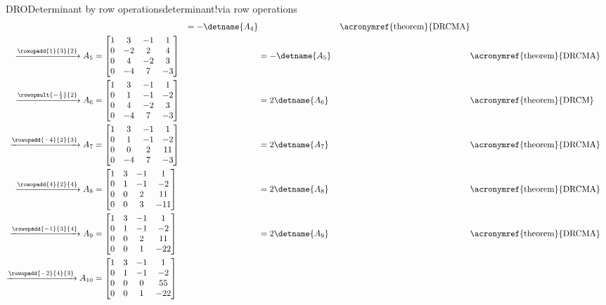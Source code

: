 \begin{example}{DRO}{Determinant by row operations}{determinant!via row operations}
\begin{align*}
&
&=-\detname{A_4}&&\text{\acronymref{theorem}{DRCMA}}\\
\xrightarrow{\rowopadd{1}{3}{2}}
A_5&=
\begin{bmatrix}
1 & 3 &-1 & 1 \\
0 &-2 & 2 & 4 \\
0 & 4 &-2 & 3 \\
0 &-4 & 7 &-3 
\end{bmatrix}
&
&=-\detname{A_5}&&\text{\acronymref{theorem}{DRCMA}}\\
\xrightarrow{\rowopmult{-\frac{1}{2}}{2}}
A_6&=
\begin{bmatrix}
1 & 3 &-1 & 1 \\
0 & 1 &-1 &-2 \\
0 & 4 &-2 & 3 \\
0 &-4 & 7 &-3 
\end{bmatrix}
&
&=2\detname{A_6}&&\text{\acronymref{theorem}{DRCM}}\\
\xrightarrow{\rowopadd{-4}{2}{3}}
A_7&=
\begin{bmatrix}
1 & 3 &-1 & 1 \\
0 & 1 &-1 &-2 \\
0 & 0 & 2 &11 \\
0 &-4 & 7 &-3 
\end{bmatrix}
&
&=2\detname{A_7}&&\text{\acronymref{theorem}{DRCMA}}\\
\xrightarrow{\rowopadd{4}{2}{4}}
A_8&=
\begin{bmatrix}
1 & 3 &-1 & 1 \\
0 & 1 &-1 &-2 \\
0 & 0 & 2 &11 \\
0 & 0 & 3 &-11 
\end{bmatrix}
&
&=2\detname{A_8}&&\text{\acronymref{theorem}{DRCMA}}\\
\xrightarrow{\rowopadd{-1}{3}{4}}
A_9&=
\begin{bmatrix}
1 & 3 &-1 & 1 \\
0 & 1 &-1 &-2 \\
0 & 0 & 2 &11 \\
0 & 0 & 1 &-22 
\end{bmatrix}
&
&=2\detname{A_9}&&\text{\acronymref{theorem}{DRCMA}}\\
\xrightarrow{\rowopadd{-2}{4}{3}}
A_{10}&=
\begin{bmatrix}
1 & 3 &-1 & 1 \\
0 & 1 &-1 &-2 \\
0 & 0 & 0 &55 \\
0 & 0 & 1 &-22 
\end{bmatrix}

\end{align*}
\end{example}
